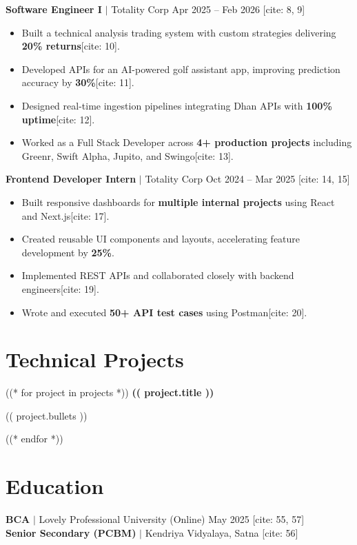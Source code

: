 \documentclass[11pt,a4paper]{article}
\begin{document}
\textbf{Software Engineer I} $|$ Totality Corp \hfill Apr 2025 -- Feb 2026 [cite: 8, 9]
\begin{itemize}
    \item Built a technical analysis trading system with custom strategies delivering \textbf{20\% returns}[cite: 10].
    \item Developed APIs for an AI-powered golf assistant app, improving prediction accuracy by \textbf{30\%}[cite: 11].
    \item Designed real-time ingestion pipelines integrating Dhan APIs with \textbf{100\% uptime}[cite: 12].
    \item Worked as a Full Stack Developer across \textbf{4+ production projects} including Greenr, Swift Alpha, Jupito, and Swingo[cite: 13].
\end{itemize}

\vspace{4pt}
\textbf{Frontend Developer Intern} $|$ Totality Corp \hfill Oct 2024 -- Mar 2025 [cite: 14, 15]
\begin{itemize}
    \item Built responsive dashboards for \textbf{multiple internal projects} using React and Next.js[cite: 17].
    \item Created reusable UI components and layouts, accelerating feature development by \textbf{25\%}.
    \item Implemented REST APIs and collaborated closely with backend engineers[cite: 19].
    \item Wrote and executed \textbf{50+ API test cases} using Postman[cite: 20].
\end{itemize}

\section*{Technical Projects}
((* for project in projects *))
\textbf{(( project.title ))} \\
\begin{itemize}
    (( project.bullets )) 
\end{itemize}
\vspace{4pt}
((* endfor *))

\section*{Education}
\textbf{BCA} $|$ Lovely Professional University (Online) \hfill May 2025 [cite: 55, 57] \\
\textbf{Senior Secondary (PCBM)} $|$ Kendriya Vidyalaya, Satna [cite: 56]
\end{document}
